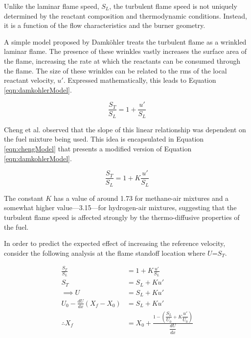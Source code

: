 Unlike the laminar flame speed, \(S_L\), the turbulent flame speed is not uniquely determined by the reactant composition and thermodynamic conditions.
Instead, it is a function of the flow characteristics and the burner geometry.

A simple model proposed by Damk{\"o}hler\cite{1940-damkohler} treats the turbulent flame as a wrinkled laminar flame.
The presence of these wrinkles vastly increases the surface area of the flame, increasing the rate at which the reactants can be consumed through the flame.
The size of these wrinkles can be related to the rms of the local reactant velocity, \(u'\).
Expressed mathematically, this leads to Equation \ref{eqn:damkohlerModel}.

\begin{equation}
\frac{ S_T }{ S_L } = 1 + \frac{ u' }{ S_L }
\label{eqn:damkohlerModel}
\end{equation}

Cheng et al.\cite{2002-cheng,2009-cheng,2010-littlejohn} observed that the slope of this linear relationship was dependent on the fuel mixture being used.
This idea is encapsulated in Equation \ref{eqn:chengModel} that presents a modified version of Equation \ref{eqn:damkohlerModel}.

\begin{equation}
\frac{ S_T }{ S_L } = 1 + K \frac{ u' }{ S_L }
\label{eqn:chengModel}
\end{equation}

The constant \(K\) has a value of around 1.73 for methane-air mixtures and a somewhat higher value---3.15---for hydrogen-air mixtures,\cite{2009-cheng} suggesting that the turbulent flame speed is affected strongly by the thermo-diffusive properties of the fuel.

In order to predict the expected effect of increasing the reference velocity, consider the following analysis at the flame standoff location where \(U\)=\(S_T\).

\begin{align}
\frac{ S_T }{ S_L } &= 1 + K \frac{ u' }{ S_L } \nonumber \\
S_T &= S_L + K u' \nonumber \\
\implies U &= S_L + K u' \nonumber \\
U_0 - \frac{ dU }{ dx } ( X_f - X_0 ) &= S_L + K u' \nonumber \\
\therefore X_f &= X_0 + \frac{1 - \left( \dfrac{ S_L }{ U_0 } + K\dfrac{ u' }{ U_0 } \right) }{ \dfrac{ dU }{ dx } }
\label{eqn:flameImmobility}
\end{align}

